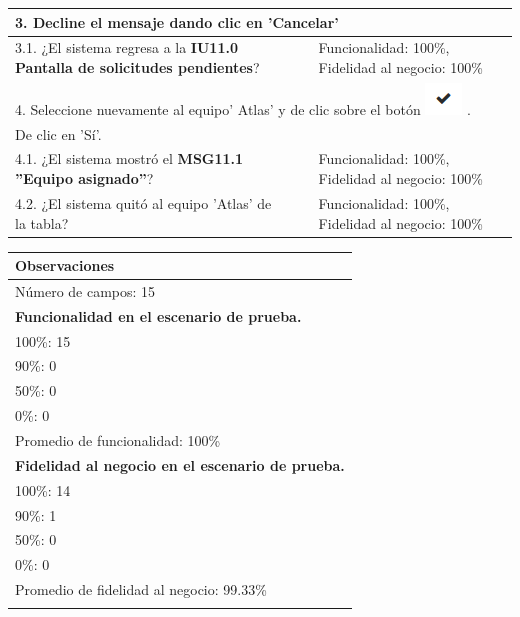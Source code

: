\documentclass[oneside,10pt]{book}
\begin{document}
\begin{tabularx}{\textwidth}{ X l l X }
\multicolumn{4}{|l|}{3. Decline el mensaje dando clic en 'Cancelar' }              \\ \hline
\multicolumn{1}{|X|}{3.1. ¿El sistema regresa a la \textbf{IU11.0 Pantalla de solicitudes pendientes}?} & \multicolumn{1}{l|}{}   & \multicolumn{1}{l|}{}   & \multicolumn{1}{X|}{Funcionalidad: 100\%, Fidelidad al negocio: 100\%}              \\ \hline

\multicolumn{4}{|l|}{4. Seleccione nuevamente al equipo' Atlas' y de clic sobre el botón \includegraphics[scale=.6]{images/aprobar} . }              \\
\multicolumn{4}{|l|}{De clic en 'Sí'.}              \\ \hline

\multicolumn{1}{|X|}{4.1. ¿El sistema mostró el \textbf{MSG11.1 ''Equipo asignado''}?} & \multicolumn{1}{l|}{}   & \multicolumn{1}{l|}{}   & \multicolumn{1}{X|}{Funcionalidad: 100\%, Fidelidad al negocio: 100\%}              \\ \hline
\multicolumn{1}{|X|}{4.2. ¿El sistema quitó al equipo 'Atlas' de la tabla?} & \multicolumn{1}{l|}{}   & \multicolumn{1}{l|}{}   & \multicolumn{1}{X|}{Funcionalidad: 100\%, Fidelidad al negocio: 100\%}              \\ \hline

\end{tabularx}

\begin{tabularx}{\textwidth}{ X }
\multicolumn{1}{X}{\cellcolor[HTML]{9B9B9B}\textbf{Observaciones}} \\ \hline
\multicolumn{1}{|l|}{Número de campos: 15 }	\\
\multicolumn{1}{|l|}{\textbf{Funcionalidad en el escenario de prueba.} }	\\
\multicolumn{1}{|l|}{100\%: 15 }	\\
\multicolumn{1}{|l|}{90\%: 0 }	\\
\multicolumn{1}{|l|}{50\%: 0 }	\\
\multicolumn{1}{|l|}{0\%: 0 }	\\
\multicolumn{1}{|l|}{Promedio de funcionalidad: 100\% }	\\
\multicolumn{1}{|l|}{\textbf{Fidelidad al negocio en el escenario de prueba.} }	\\
\multicolumn{1}{|l|}{100\%: 14 }	\\
\multicolumn{1}{|l|}{90\%: 1 }	\\
\multicolumn{1}{|l|}{50\%: 0 }	\\
\multicolumn{1}{|l|}{0\%: 0 }	\\
\multicolumn{1}{|l|}{Promedio de fidelidad al negocio: 99.33\% }	\\
\multicolumn{1}{|l|}{ }	\\ \hline
\end{tabularx}
\end{document}
